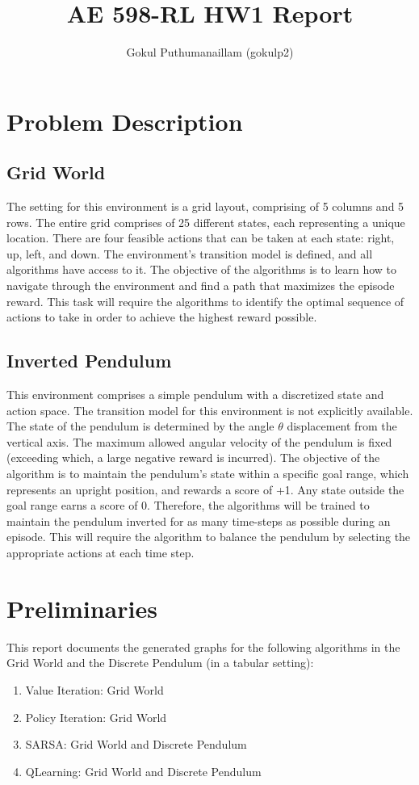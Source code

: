 \documentclass[conf]{new-aiaa}
\title{AE 598-RL HW1 Report}
\author{Gokul Puthumanaillam (gokulp2)}
\affil{Department of Aerospace Engineering, University of Illinois Urbana-Champaign}
\begin{document}
\maketitle


\section{Problem Description}
\subsection{Grid World}
The setting for this environment is a grid layout, comprising of 5 columns and 5 rows. The entire grid comprises of 25 different states, each representing a unique location. There are four feasible actions that can be taken at each state: right, up, left, and down. The environment's transition model is defined, and all algorithms have access to it. The objective of the algorithms is to learn how to navigate through the environment and find a path that maximizes the episode reward. This task will require the algorithms to identify the optimal sequence of actions to take in order to achieve the highest reward possible.

\subsection{Inverted Pendulum}
This environment comprises a simple pendulum with a discretized state and action space. The transition model for this environment is not explicitly available. The state of the pendulum is determined by the angle $\theta$ displacement from the vertical axis. The maximum allowed angular velocity of the pendulum is fixed (exceeding which, a large negative reward is incurred). The objective of the algorithm is to maintain the pendulum's state within a specific goal range, which represents an upright position, and rewards a score of +1. Any state outside the goal range earns a score of 0. Therefore, the algorithms will be trained to maintain the pendulum inverted for as many time-steps as possible during an episode. This will require the algorithm to balance the pendulum by selecting the appropriate actions at each time step.

\section{Preliminaries}
This report documents the generated graphs for the following algorithms in the Grid World and the Discrete Pendulum (in a tabular setting):
\begin{enumerate}
    \item Value Iteration: Grid World
    \item Policy Iteration: Grid World
    \item SARSA: Grid World and Discrete Pendulum
    \item QLearning: Grid World and Discrete Pendulum
\end{enumerate}
\end{document}
